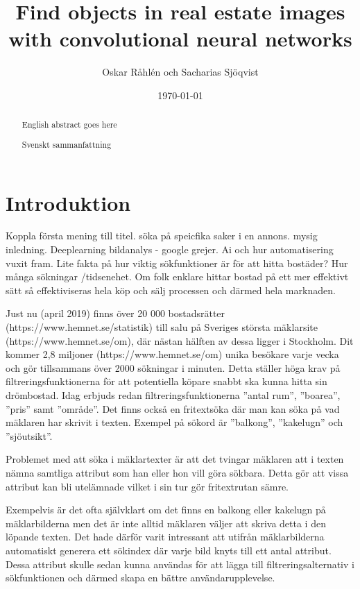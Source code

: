 \documentclass[]{kththesis}
\title{Find objects in real estate images with convolutional neural networks}
\author{Oskar Råhlén och Sacharias Sjöqvist}
\date{\today}
\begin{document}
\frontmatter

\begin{abstract}
    English abstract goes here
\end{abstract}

\begin{otherlanguage}{swedish}
  \begin{abstract}
    Svenskt sammanfattning
  \end{abstract}
\end{otherlanguage}
  
\tableofcontents

\mainmatter

\chapter{Introduktion}
Koppla första mening till titel. söka på speicfika saker i en annons. mysig inledning. Deeplearning bildanalys - google grejer. Ai och hur automatisering vuxit fram. Lite fakta på hur viktig sökfunktioner är för att hitta bostäder? Hur många sökningar /tidsenehet. Om folk enklare hittar bostad på ett mer effektivt sätt så effektiviseras hela köp och sälj processen och därmed hela marknaden.

Just nu (april 2019) finns över 20 000 bostadsrätter (https://www.hemnet.se/statistik) till salu på Sveriges största mäklarsite (https://www.hemnet.se/om), där nästan hälften av dessa ligger i Stockholm. 
Dit kommer 2,8 miljoner (https://www.hemnet.se/om) unika besökare varje vecka och gör tillsammans över 2000 sökningar i minuten.
Detta ställer höga krav på filtreringsfunktionerna för att potentiella köpare snabbt ska kunna hitta sin drömbostad.
Idag erbjuds redan filtreringsfunktionerna ”antal rum”, ”boarea”, ”pris” samt ”område”. 
Det finns också en fritextsöka där man kan söka på vad mäklaren har skrivit i texten.
Exempel på sökord är ”balkong”, ”kakelugn” och ”sjöutsikt”. 

Problemet med att söka i mäklartexter är att det tvingar mäklaren att i texten nämna samtliga attribut som han eller hon vill göra sökbara. 
Detta gör att vissa attribut kan bli utelämnade vilket i sin tur gör fritextrutan sämre.

Exempelvis är det ofta självklart om det finns en balkong eller kakelugn på mäklarbilderna men det är inte alltid mäklaren väljer att skriva detta i den löpande texten.
Det hade därför varit intressant att utifrån mäklarbilderna automatiskt generera ett sökindex där varje bild knyts till ett antal attribut.
Dessa attribut skulle sedan kunna användas för att lägga till filtreringsalternativ i sökfunktionen och därmed skapa en bättre användarupplevelse.
\end{document}
